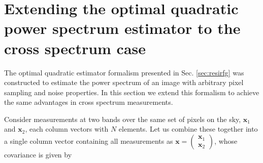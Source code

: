 \documentclass[numberedappendix]{emulateapj}
\newcommand{\xb}{\mathbf{x}}
\begin{document}
\section{Extending the optimal quadratic power spectrum estimator to the cross spectrum case}
\label{sec:optimalestimatorforcrossspectrum}

The optimal quadratic estimator formalism presented in Sec. \ref{sec:resirfg} was constructed to estimate the power spectrum of an image with arbitrary pixel sampling and noise properties. In this section we extend this formalism to achieve the same advantages in cross spectrum measurements. 

Consider measurements at two bands over the same set of pixels on the sky, $\xb_1$ and $\xb_2$, each column vectors with $N$ elements. Let us combine these together into a single column vector containing all measurements as $\xb=\left(\begin{matrix}\xb_1 \\ \xb_2  \end{matrix}\right)$, whose covariance is given by 
\end{document}
